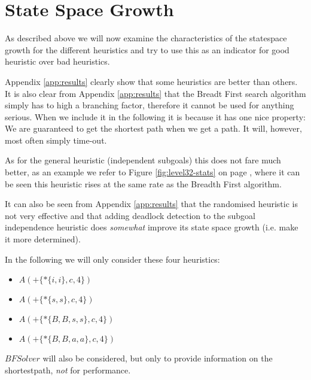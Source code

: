 \section{State Space Growth}
As described above we will now examine the characteristics of the
statespace growth for the different heuristics and try to use this as
an indicator for good heuristic over bad heuristics.

Appendix \ref{app:results} clearly show that some heuristics are
better than others. It is also clear from Appendix \ref{app:results}
that the Breadt First search algorithm simply has to high a branching
factor, therefore it cannot be used for anything serious. When we
include it in the following it is because it has one nice property: We
are guaranteed to get the shortest path when we get a path. It will,
however, most often simply time-out.

As for the general heuristic (independent subgoals) this does not fare
much better, as an example we refer to Figure \ref{fig:level32-stats}
on page \pageref{fig:level32-stats}, where it can be seen this
heuristic rises at the same rate as the Breadth First algorithm.

It can also be seen from Appendix \ref{app:results} that the
randomised heuristic is not very effective and that adding deadlock
detection to the subgoal independence heuristic does \emph{somewhat}
improve its state space growth (i.e. make it more determined).

In the following we will only consider these four heuristics:

\begin{itemize}
\item $A(+\{*\{i,i\},c,4\})$
\item $A(+\{*\{s,s\},c,4\})$
\item $A(+\{*\{B,B,s,s\},c,4\})$
\item $A(+\{*\{B,B,a,a\},c,4\})$
\end{itemize}

$BFSolver$ will also be considered, but only to provide information on
the shortestpath, \emph{not} for performance.

